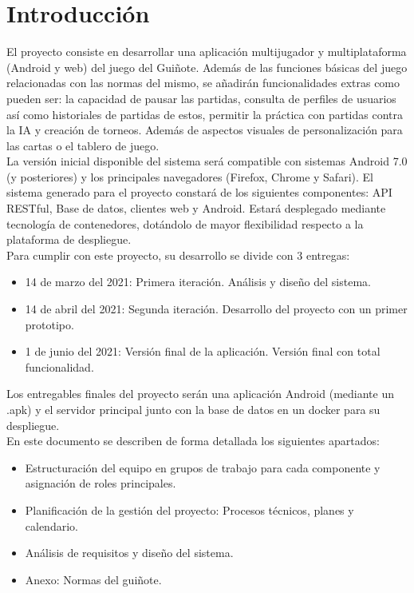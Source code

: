 \documentclass{article}
\begin{document}
\section{Introducción}
El proyecto consiste en desarrollar una aplicación multijugador y multiplataforma (Android y web) del juego del Guiñote. Además de las funciones básicas del juego relacionadas con las normas del mismo, se añadirán funcionalidades extras como pueden ser: la capacidad de pausar las partidas, consulta de perfiles de usuarios así como historiales de partidas de estos, permitir la práctica con partidas contra la IA y creación de torneos. Además de aspectos visuales de personalización para las cartas o el tablero de juego.\\

La versión inicial disponible del sistema será compatible con sistemas Android 7.0 (y posteriores) y los principales navegadores (Firefox, Chrome y Safari). El sistema generado para el proyecto constará de los siguientes componentes: API RESTful, Base de datos, clientes web y Android. Estará desplegado mediante tecnología de contenedores, dotándolo de mayor flexibilidad respecto a la plataforma de despliegue.\\

Para cumplir con este proyecto, su desarrollo se divide con 3 entregas:
\begin{itemize}
	\item 14 de marzo del 2021: Primera iteración. Análisis y diseño del sistema.
	\item 14 de abril del 2021: Segunda iteración. Desarrollo del proyecto con un primer prototipo.
	\item 1 de junio del 2021: Versión final de la aplicación. Versión final con total funcionalidad.	
\end{itemize}
Los entregables finales del proyecto serán una aplicación Android (mediante un .apk) y el servidor principal junto con la base de datos en un docker para su despliegue.\\

En este documento se describen de forma detallada los siguientes apartados:
\begin{itemize}
	\item Estructuración del equipo en grupos de trabajo para cada componente y asignación de roles principales.
	\item Planificación de la gestión del proyecto: Procesos técnicos, planes y calendario.
	\item Análisis de requisitos y diseño del sistema.
	\item Anexo: Normas del guiñote.
\end{itemize}
\end{document}
